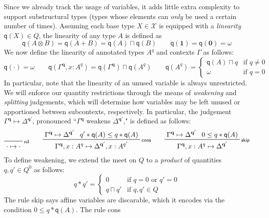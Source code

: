 \documentclass[acmsmall,screen,anonymous,review]{acmart}
\newcommand{\mc}[1]{\ensuremath{\mathcal{#1}}}
\newcommand{\mb}[1]{\ensuremath{\mathbf{#1}}}
\newcommand{\ms}[1]{\ensuremath{\mathsf{#1}}}
\newcommand{\cwk}[2]{#1 \mapsto #2}
\newcommand{\rle}[1]{{\scriptsize\textsf{#1}}}
\newcommand{\brle}[1]{{\textsf{#1}}}
\newcommand{\zeroq}{0}
\newcommand{\topq}{\omega}
\newcommand{\alquant}{\ms{q}}
\begin{document}
  Since we already track the usage of variables, it adds little extra
complexity to support substructural types (types whose elements can \emph{only} be used a
certain number of times). Assuming each base type $X \in \mc{X}$ is
equipped with a \emph{linearity} $\alquant(X) \in Q$, the linearity of any type $A$ is defined as
\begin{equation}
  \alquant(A \otimes B) = \alquant(A + B) = \alquant(A) \sqcap \alquant(B) \qquad
  \alquant(\mb{1}) = \alquant(\mb{0}) = \topq
\end{equation}
We now define the linearity of annotated types $A^q$ and contexts $\Gamma$ as follows:
\begin{equation}
  \alquant(\cdot) = \topq \qquad
  \alquant(\Gamma^{\mb{q}}, x : A^q) 
    = \alquant(\Gamma^{\mb{q}}) \sqcap \alquant(A^q) \qquad 
  \alquant(A^q) = \begin{cases}
    \alquant(A) \sqcap q & \text{if } q \neq 0 \\
    \topq & \text{if } q = 0
  \end{cases}
\end{equation}
In particular, note that the linearity of an unused variable is always unrestricted.
%
We will enforce our quantity restrictions through the means of \emph{weakening} and \emph{splitting}
judgements, which will determine how variables may be left unused or apportioned between
subcontexts, respectively. In particular, the judgement $\cwk{\Gamma^{\mb{q}}}{\Delta^{\mb{q}'}}$,
pronounced ``$\Gamma^{\mb{q}}$ weakens $\Delta^{\mb{q'}}$," is defined as follows:
\begin{gather*}
  \prftree[r]{\rle{nil}}{\cwk{\cdot}{\cdot}} \qquad 
  \prftree[r]{\rle{cons}}
    {\cwk{\Gamma^{\mb{q}}}{\Delta^{\mb{q}'}}}
    {q' * \alquant(A) \leq q * \alquant(A)}
    {\cwk{\Gamma^{\mb{q}}, x : A^q}
         {\Delta^{\mb{q}'}, x : A^{q'}}} \qquad
  \prftree[r]{\rle{skip}}
    {\cwk{\Gamma^{\mb{q}}}{\Delta^{\mb{q}'}}}
    {\zeroq \leq q * \alquant(A)}
    {\cwk{\Gamma^{\mb{q}}, x : A^q}{\Delta}^{\mb{q}'}}
\end{gather*}
To define weakening, we extend the meet on $Q$ to a \emph{product} of quantities $q, q' \in Q^0$ as follows:
\begin{equation}
  q * q' = \begin{cases}
    0 & \text{if } q = 0 \text{ or } q' = 0 \\
    q \sqcap q' & \text{if } q, q' \in Q
  \end{cases}
\end{equation}
The rule \brle{skip} says affine variables are discarable, which it encodes via the condition $\zeroq \leq q * \alquant(A)$.  The rule \brle{cons}
\end{document}
